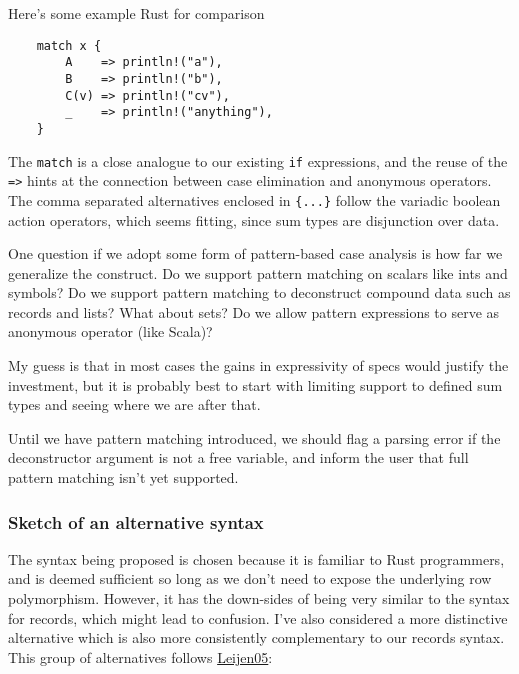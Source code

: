 \documentclass[11pt]{article}
\begin{document}
Here's some example Rust for comparison

\begin{verbatim}
    match x {
        A    => println!("a"),
        B    => println!("b"),
        C(v) => println!("cv"),
        _    => println!("anything"),
    }
\end{verbatim}

The \texttt{match} is a close analogue to our existing \texttt{if} expressions, and
the reuse of the \texttt{=>} hints at the connection between case elimination
and anonymous operators. The comma separated alternatives enclosed in
\texttt{\{...\}} follow the variadic boolean action operators, which seems
fitting, since sum types are disjunction over data.

One question if we adopt some form of pattern-based case analysis is how far we
generalize the construct. Do we support pattern matching on scalars like ints
and symbols? Do we support pattern matching to deconstruct compound data such as
records and lists? What about sets? Do we allow pattern expressions to serve as
anonymous operator (like Scala)?

My guess is that in most cases the gains in expressivity of specs would justify
the investment, but it is probably best to start with limiting support to
defined sum types and seeing where we are after that.

Until we have pattern matching introduced, we should flag a parsing error if the
deconstructor argument is not a free variable, and inform the user that full pattern
matching isn't yet supported.

\subsubsection{Sketch of an alternative syntax}
\label{sec:org726607c}
The syntax being proposed is chosen because it is familiar to Rust programmers,
and is deemed sufficient so long as we don't need to expose the underlying row
polymorphism. However, it has the down-sides of being very similar to the syntax
for records, which might lead to confusion. I've also considered a more distinctive alternative which
is also more consistently complementary to our records syntax. This group of alternatives follows \href{https://www.microsoft.com/en-us/research/publication/extensible-records-with-scoped-labels/}{Leijen05}:
\end{document}
